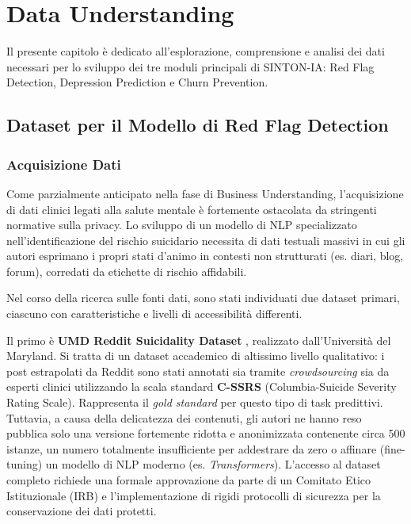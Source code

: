 \chapter{Data Understanding}
\label{ch:data_understanding}

Il presente capitolo è dedicato all'esplorazione, comprensione e analisi dei dati necessari per lo sviluppo dei tre moduli principali di SINTON-IA: Red Flag Detection, Depression Prediction e Churn Prevention.

\section{Dataset per il Modello di Red Flag Detection}
\label{sec:data_red_flag}

\subsection{Acquisizione Dati}
\label{subsec:acquisizione_red_flag}

Come parzialmente anticipato nella fase di Business Understanding, l'acquisizione di dati clinici legati alla salute mentale è fortemente ostacolata da stringenti normative sulla privacy. Lo sviluppo di un modello di NLP specializzato nell'identificazione del rischio suicidario necessita di dati testuali massivi in cui gli autori esprimano i propri stati d'animo in contesti non strutturati (es. diari, blog, forum), corredati da etichette di rischio affidabili.

Nel corso della ricerca sulle fonti dati, sono stati individuati due dataset primari, ciascuno con caratteristiche e livelli di accessibilità differenti.

Il primo è \textbf{UMD Reddit Suicidality Dataset} \cite{umd_reddit_suicidality}, realizzato dall'Università del Maryland. Si tratta di un dataset accademico di altissimo livello qualitativo: i post estrapolati da Reddit sono stati annotati sia tramite \textit{crowdsourcing} sia da esperti clinici utilizzando la scala standard \textbf{C-SSRS} (Columbia-Suicide Severity Rating Scale). Rappresenta il \textit{gold standard} per questo tipo di task predittivi.
Tuttavia, a causa della delicatezza dei contenuti, gli autori ne hanno reso pubblica solo una versione fortemente ridotta e anonimizzata contenente circa 500 istanze, un numero totalmente insufficiente per addestrare da zero o affinare (fine-tuning) un modello di NLP moderno (es. \textit{Transformers}). L'accesso al dataset completo richiede una formale approvazione da parte di un Comitato Etico Istituzionale (IRB) e l'implementazione di rigidi protocolli di sicurezza per la conservazione dei dati protetti.

